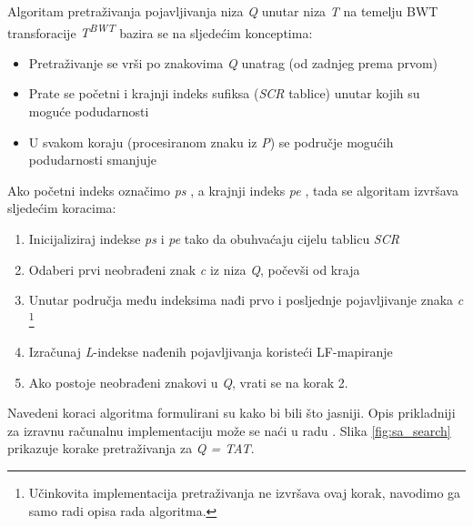 \documentclass[times, utf8, seminar, numeric]{fer}
\begin{document}
Algoritam pretraživanja pojavljivanja niza \textit{Q} unutar niza \textit{T} na temelju
BWT transforacije \textit{T\textsuperscript{BWT}} bazira se na sljedećim konceptima:

\begin{itemize}
  \item{Pretraživanje se vrši po znakovima \textit{Q} unatrag (od zadnjeg prema prvom)}
  \item{Prate se početni i krajnji indeks sufiksa (\textit{SCR} tablice) unutar kojih su moguće podudarnosti}
  \item{U svakom koraju (procesiranom znaku iz \textit{P}) se područje mogućih podudarnosti smanjuje}
\end{itemize}

Ako početni indeks označimo \textit{ps} , a krajnji indeks \textit{pe}
, tada se algoritam izvršava sljedećim koracima:

\begin{enumerate}
  \item{Inicijaliziraj indekse \textit{ps} i \textit{pe} tako da obuhvaćaju cijelu tablicu \textit{SCR}}
  \item{Odaberi prvi neobrađeni znak \textit{c} iz niza \textit{Q}, počevši od kraja}
  \item{Unutar područja među indeksima nađi prvo i posljednje pojavljivanje znaka \textit{c}
    \footnote{Učinkovita implementacija pretraživanja ne izvršava ovaj korak, navodimo ga
    samo radi opisa rada algoritma.}}
  \item{Izračunaj \textit{L}-indekse nađenih pojavljivanja koristeći LF-mapiranje}
  \item{Ako postoje neobrađeni znakovi u \textit{Q}, vrati se na korak 2.}
\end{enumerate}

Navedeni koraci algoritma formulirani su kako bi bili što jasniji. Opis prikladniji
za izravnu računalnu implementaciju može se naći u radu \cite{singer_2012}. Slika
\ref{fig:sa_search} prikazuje korake pretraživanja za \textit{Q = TAT}.
\end{document}
